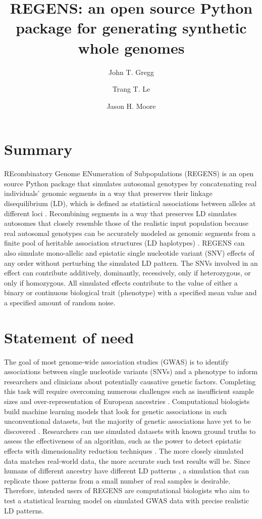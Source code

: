\documentclass[11pt]{article}
\title{REGENS: an open source Python package for generating synthetic whole genomes}
\date{}
\author[1]{John T. Gregg}
\author[1]{Trang T. Le}
\author[1]{Jason H. Moore}
\affil[1]{Department of Biostatistics, Epidemiology and Informatics, University of Pennsylvania, Philadelphia, PA 19087, USA.}
\affil[*]{Corresponding author. Email: jhmoore@upenn.edu}
\begin{document}
\maketitle

\begin{singlespace}
\section{Summary}

REcombinatory Genome ENumeration of Subpopulations (REGENS) is an open source Python package that simulates autosomal genotypes by concatenating real individuals' genomic segments in a way that preserves their linkage disequilibrium (LD), which is defined as statistical associations between alleles at different loci \cite{slatkin2008linkage}. Recombining segments in a way that preserves LD simulates autosomes that closely resemble those of the realistic input population \cite{source:1} because real autosomal genotypes can be accurately modeled as genomic segments from a finite pool of heritable association structures (LD haplotypes) \cite{source:3}.
REGENS can also simulate mono-allelic and epistatic single nucleotide variant (SNV) effects of any order without perturbing the simulated LD pattern.
The SNVs involved in an effect can contribute additively, dominantly, recessively, only if heterozygous, or only if homozygous.
All simulated effects contribute to the value of either a binary or continuous biological trait (phenotype) with a specified mean value and a specified amount of random noise.  

\section{Statement of need}

The goal of most genome-wide association studies (GWAS) is to identify associations between single nucleotide variants (SNVs) and a phenotype to inform researchers and clinicians about potentially causative genetic factors. Completing this task will require overcoming numerous challenges such as insufficient sample sizes and over-representation of European ancestries \cite{torkamani2018personal}. Computational biologists build machine learning models that look for genetic associations in such unconventional datasets, but the majority of genetic associations have yet to be discovered \cite{source:4}. Researchers can use simulated datasets with known ground truths to assess the effectiveness of an algorithm, such as the power to detect epistatic effects with dimensionality reduction techniques \cite{source:11}. The more closely simulated data matches real-world data, the more accurate such test results will be. Since humans of different ancestry have different LD patterns \cite{source:5}, a simulation that can replicate those patterns from a small number of real samples is desirable. Therefore, intended users of REGENS are computational biologists who aim to test a statistical learning model on simulated GWAS data with precise realistic LD patterns.\\


\end{singlespace}
\end{document}
